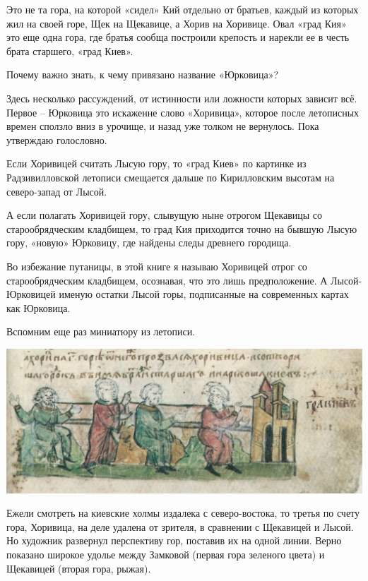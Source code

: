 Это не та гора, на которой «сидел» Кий отдельно от братьев, каждый из которых жил на своей горе, Щек на Щекавице, а Хорив на Хоривице. Овал «град Кия» это еще одна гора, где братья сообща построили крепость и нарекли ее в честь брата старшего, «град Киев».

Почему важно знать, к чему привязано название «Юрковица»?

Здесь несколько рассуждений, от истинности или ложности которых зависит всё. Первое – Юрковица это искаженне слово «Хоривица», которое после летописных времен сползло вниз в урочище, и назад уже толком не вернулось. Пока утверждаю голословно.

Если Хоривицей считать Лысую гору, то «град Киев» по картинке из Радзивилловской летописи смещается дальше по Кирилловским высотам на северо-запад от Лысой.

А если полагать Хоривицей гору, слывущую ныне отрогом Щекавицы со старообрядческим кладбищем, то град Кия приходится точно на бывшую Лысую гору, «новую» Юрковицу, где найдены следы древнего городища.

Во избежание путаницы, в этой книге я называю Хоривицей отрог со старообрядческим кладбищем, осознавая, что это лишь предположение. А Лысой-Юрковицей именую остатки Лысой горы, подписанные на современных картах как Юрковица.

Вспомним еще раз миниатюру из летописи.

\begin{center}
\includegraphics[width=\linewidth]{chast-kirvys/poisk-yourk/radz-tri-brata.jpg}
\end{center} 

Ежели смотреть на киевские холмы издалека с северо-востока, то третья по счету гора, Хоривица, на деле удалена от зрителя, в сравнении с Щекавицей и Лысой. Но художник развернул перспективу гор, поставив их на одной линии. Верно показано широкое удолье между Замковой (первая гора зеленого цвета) и Щекавицей (вторая гора, рыжая). 

